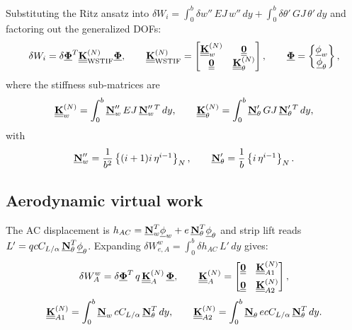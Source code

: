 Substituting the Ritz ansatz into $\delta W_i = \int_0^b \delta w''\,EJ\,w''\,dy + \int_0^b \delta\theta'\,GJ\,\theta'\,dy$ and factoring out the generalized DOFs:
\begin{equation}
\delta W_i = \delta\underline{\mathbf{\Phi}}^T \underline{\underline{\mathbf{K}}}_{\mathrm{WSTIF}}^{(N)} \underline{\mathbf{\Phi}}, \qquad
\underline{\underline{\mathbf{K}}}_{\mathrm{WSTIF}}^{(N)} = \begin{bmatrix}\underline{\underline{\mathbf{K}}}_w^{(N)} & \underline{\underline{\mathbf{0}}} \\ \underline{\underline{\mathbf{0}}} & \underline{\underline{\mathbf{K}}}_\theta^{(N)}\end{bmatrix}, \qquad
\underline{\mathbf{\Phi}} = \begin{Bmatrix}\underline{\mathbf{\phi}}_w \\ \underline{\mathbf{\phi}}_\theta\end{Bmatrix},
\end{equation}
where the stiffness sub-matrices are
\begin{equation}
\underline{\underline{\mathbf{K}}}_w^{(N)} = \int_0^b \underline{\mathbf{N}}_w''\,EJ\,\underline{\mathbf{N}}_w''{}^T\,dy, \qquad
\underline{\underline{\mathbf{K}}}_\theta^{(N)} = \int_0^b \underline{\mathbf{N}}_\theta'\,GJ\,\underline{\mathbf{N}}_\theta'{}^T\,dy,
\end{equation}
with
\begin{equation}
\underline{\mathbf{N}}_w'' = \frac{1}{b^2}\begin{Bmatrix}(i+1)i\,\eta^{i-1}\end{Bmatrix}_N, \qquad
\underline{\mathbf{N}}_\theta' = \frac{1}{b}\begin{Bmatrix}i\,\eta^{i-1} \end{Bmatrix}_N.
\end{equation}

\subsection*{Aerodynamic virtual work}

The AC displacement is $h_{AC} = \underline{\mathbf{N}}_w^T\underline{\mathbf{\phi}}_w + e\,\underline{\mathbf{N}}_\theta^T\underline{\mathbf{\phi}}_\theta$ and strip lift reads $L'=qcC_{L/\alpha}\,\underline{\mathbf{N}}_\theta^T\underline{\mathbf{\phi}}_\theta$. Expanding $\delta W_{e,A}^w = \int_0^b \delta h_{AC}\,L'\,dy$ gives:
\begin{equation}
\delta W_{A}^{w} = \delta\underline{\mathbf{\Phi}}^T\,q\,\underline{\underline{\mathbf{K}}}_A^{(N)}\,\underline{\mathbf{\Phi}}, \qquad
\underline{\underline{\mathbf{K}}}_A^{(N)} = \begin{bmatrix}\underline{\underline{\mathbf{0}}} & \underline{\underline{\mathbf{K}}}_{A1}^{(N)} \\[5pt] \underline{\underline{\mathbf{0}}} & \underline{\underline{\mathbf{K}}}_{A2}^{(N)}\end{bmatrix},
\end{equation}
\begin{equation}
\underline{\underline{\mathbf{K}}}_{A1}^{(N)} = \int_0^b \underline{\mathbf{N}}_w \,cC_{L/\alpha}\, \underline{\mathbf{N}}_\theta^T\,dy, \qquad
\underline{\underline{\mathbf{K}}}_{A2}^{(N)} = \int_0^b \underline{\mathbf{N}}_\theta \,ecC_{L/\alpha}\, \underline{\mathbf{N}}_\theta^T\,dy.
\end{equation}

